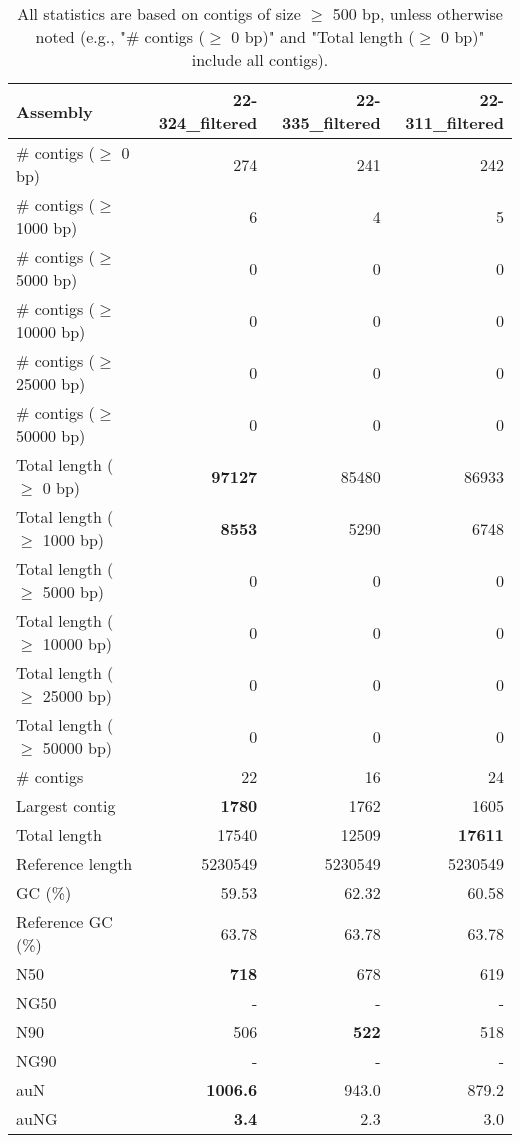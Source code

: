 \documentclass[12pt,a4paper]{article}
\begin{document}
\begin{table}[ht]
\begin{center}
\caption{All statistics are based on contigs of size $\geq$ 500 bp, unless otherwise noted (e.g., "\# contigs ($\geq$ 0 bp)" and "Total length ($\geq$ 0 bp)" include all contigs).}
\begin{tabular}{|l*{3}{|r}|}
\hline
Assembly & 22-324\_filtered & 22-335\_filtered & 22-311\_filtered \\ \hline
\# contigs ($\geq$ 0 bp) & 274 & 241 & 242 \\ \hline
\# contigs ($\geq$ 1000 bp) & 6 & 4 & 5 \\ \hline
\# contigs ($\geq$ 5000 bp) & 0 & 0 & 0 \\ \hline
\# contigs ($\geq$ 10000 bp) & 0 & 0 & 0 \\ \hline
\# contigs ($\geq$ 25000 bp) & 0 & 0 & 0 \\ \hline
\# contigs ($\geq$ 50000 bp) & 0 & 0 & 0 \\ \hline
Total length ($\geq$ 0 bp) & {\bf 97127} & 85480 & 86933 \\ \hline
Total length ($\geq$ 1000 bp) & {\bf 8553} & 5290 & 6748 \\ \hline
Total length ($\geq$ 5000 bp) & 0 & 0 & 0 \\ \hline
Total length ($\geq$ 10000 bp) & 0 & 0 & 0 \\ \hline
Total length ($\geq$ 25000 bp) & 0 & 0 & 0 \\ \hline
Total length ($\geq$ 50000 bp) & 0 & 0 & 0 \\ \hline
\# contigs & 22 & 16 & 24 \\ \hline
Largest contig & {\bf 1780} & 1762 & 1605 \\ \hline
Total length & 17540 & 12509 & {\bf 17611} \\ \hline
Reference length & 5230549 & 5230549 & 5230549 \\ \hline
GC (\%) & 59.53 & 62.32 & 60.58 \\ \hline
Reference GC (\%) & 63.78 & 63.78 & 63.78 \\ \hline
N50 & {\bf 718} & 678 & 619 \\ \hline
NG50 & - & - & - \\ \hline
N90 & 506 & {\bf 522} & 518 \\ \hline
NG90 & - & - & - \\ \hline
auN & {\bf 1006.6} & 943.0 & 879.2 \\ \hline
auNG & {\bf 3.4} & 2.3 & 3.0 \\ \hline

\end{tabular}
\end{center}
\end{table}
\end{document}

